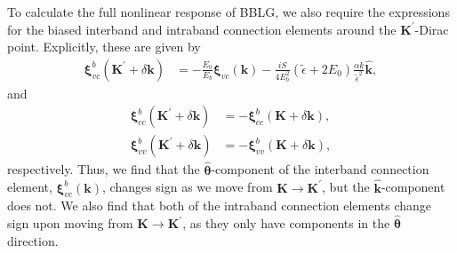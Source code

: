 \documentclass[twocolumn,secnumarabic,amssymb, nobibnotes, aps, prd, superscriptaddress]{revtex4-1}
\begin{document}
To calculate the full nonlinear response of BBLG, we also require the expressions for the biased interband and intraband connection elements around the $\mathbf{K}^{\prime}$-Dirac point. Explicitly, these are given by
\begin{equation}
\begin{aligned}\mathbf{\xi}_{vc}^{b}\left(\mathbf{K}^{\prime}+\delta\mathbf{k}\right) & =-\frac{E_{0}}{E_{b}}\mathbf{\xi}_{vc}(\mathbf{k})-\frac{iS}{4E_{b}^{2}}\left(\tilde{\epsilon}+2E_{0}\right)\frac{\alpha k}{\tilde{\epsilon}^2}\hat{\mathbf{k}},\end{aligned}\label{eq:connecp}
\end{equation}
and
\begin{equation}
\begin{aligned}\mathbf{\xi}_{cc}^{b}\left(\mathbf{K}^{\prime}+\delta\mathbf{k}\right) & =-\mathbf{\xi}_{cc}^{b}\left(\mathbf{K}+\delta\mathbf{k}\right),\\
\mathbf{\xi}_{vv}^{b}\left(\mathbf{K}^{\prime}+\delta\mathbf{k}\right) & =-\mathbf{\xi}_{vv}^{b}\left(\mathbf{K}+\delta\mathbf{k}\right),
\end{aligned}
\end{equation}
respectively. Thus, we find that the $\hat{\mathbf{\theta}}$-component of the interband connection element, $\mathbf{\xi}_{vc}^{b}(\mathbf{k})$, changes sign as we move from $\mathbf{K}\rightarrow \mathbf{K}^{\prime}$, but the $\hat{\mathbf{k}}$-component does not. We also find that both of the intraband connection elements change sign upon moving from $\mathbf{K}\rightarrow \mathbf{K}^{\prime}$, as they only have components in the $\hat{\mathbf{\theta}}$ direction.
\end{document}
